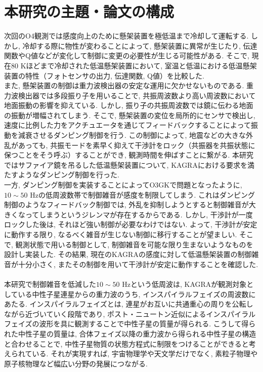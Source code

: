 \section{本研究の主題・論文の構成}
次回のO4観測では感度向上のために懸架装置を極低温まで冷却して運転する. しかし, 冷却する際に物性が変わることによって, 懸架装置に異常が生じたり, 伝達関数やQ値などが変化して制御に変更の必要性が生じる可能性がある. そこで, 現在80 Kほどまで冷却された低温懸架装置において, 室温と低温における低温懸架装置の特性（フォトセンサの出力, 伝達関数, Q値）を比較した. \\
\quad また, 懸架装置の制御は重力波検出器の安定な運用に欠かせないものである. 重力波検出器では多段振り子を用いることで, 共振周波数より高い周波数において地面振動の影響を抑えている. しかし, 振り子の共振周波数では鏡に伝わる地面の振動が増幅されてしまう. そこで, 懸架装置の変位を局所的にセンサで検出し, 速度に比例した力をアクチュエータを通じてフィードバックすることによって振動を減衰させるダンピング制御を行う. この制御によって, 地震などの大きな外乱があっても, 共振モードを素早く抑えて干渉計をロック（共振器を共振状態に保つことをそう呼ぶ）することができ, 観測時間を伸ばすことに繋がる. 本研究ではサファイア鏡を吊るした低温懸架装置について, KAGRAにおける要求を満たすようなダンピング制御を行った. \\
\quad 一方, ダンピング制御を実装することによってO3GKで問題となったように, $10\sim50$ Hzの低周波数帯で制御雑音が感度を制限してしまう. これはダンピング制御のようなフィードバック制御では, 外乱を抑制しようとすると制御雑音が大きくなってしまうというジレンマが存在するからである. しかし, 干渉計が一度ロックした後は, それほど強い制御が必要なわけではない. よって, 干渉計が安定に動作する限り, なるべく雑音が生じない制御に移行することが望ましい. そこで, 観測状態で用いる制御として, 制御雑音を可能な限り生まないようなものを設計し実装した. その結果, 現在のKAGRAの感度に対して低温懸架装置の制御雑音が十分小さく, またその制御を用いて干渉計が安定に動作することを確認した. \\\\
\noindent
\quad 本研究で制御雑音を低減した$10\sim50$ Hzという低周波は, KAGRAが観測対象としている中性子星連星からの重力波のうち, インスパイラルフェイズの周波数にあたる. インスパイラルフェイズとは, 連星がお互いに共通重心の周りを公転しながら近づいていく段階であり, ポスト・ニュートン近似によるインスパイラルフェイズの波形を具に観測することで中性子星の質量が得られる\cite{compact}. こうして得られた中性子星の質量は, 合体フェイズ以降の重力波から得られる中性子星の構造と合わせることで, 中性子星物質の状態方程式に制限をつけることができると考えられている. それが実現すれば, 宇宙物理学や天文学だけでなく, 素粒子物理や原子核物理など幅広い分野の発展につながる.\\\\

